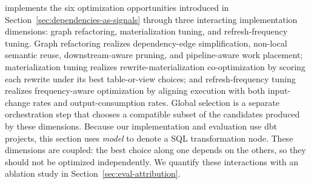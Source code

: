 
\tool{} implements the six optimization opportunities introduced in Section~\ref{sec:dependencies-as-signals} through three interacting implementation dimensions: graph refactoring, materialization tuning, and refresh-frequency tuning. Graph refactoring realizes dependency-edge simplification, non-local semantic reuse, downstream-aware pruning, and pipeline-aware work placement; materialization tuning realizes rewrite-materialization co-optimization by scoring each rewrite under its best table-or-view choices; and refresh-frequency tuning realizes frequency-aware optimization by aligning execution with both input-change rates and output-consumption rates. Global selection is a separate orchestration step that chooses a compatible subset of the candidates produced by these dimensions. Because our implementation and evaluation use dbt projects, this section uses \emph{model} to denote a SQL transformation node.
These dimensions are coupled: the best choice along one depends on the others, so they should not be optimized independently. We quantify these interactions with an ablation study in Section~\ref{sec:eval-attribution}.

